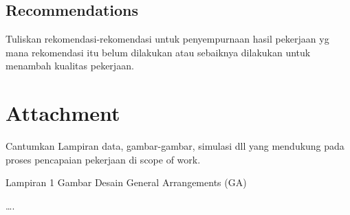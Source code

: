 \documentclass[12pt,a4paper,twoside,openright]{book}
\theoremstyle{definition}
\theoremstyle{plain}
\theoremstyle{remark}
\begin{document}
\section{Recommendations}

Tuliskan rekomendasi-rekomendasi untuk penyempurnaan hasil pekerjaan yg mana rekomendasi itu belum dilakukan atau sebaiknya dilakukan untuk menambah kualitas pekerjaan.


\chapter{Attachment}

Cantumkan Lampiran data, gambar-gambar, simulasi dll yang mendukung pada proses pencapaian pekerjaan di scope of work.

\medskip
\noindent Lampiran 1 Gambar Desain General Arrangements (GA)

\noindent \ldots.



%
\end{document}
